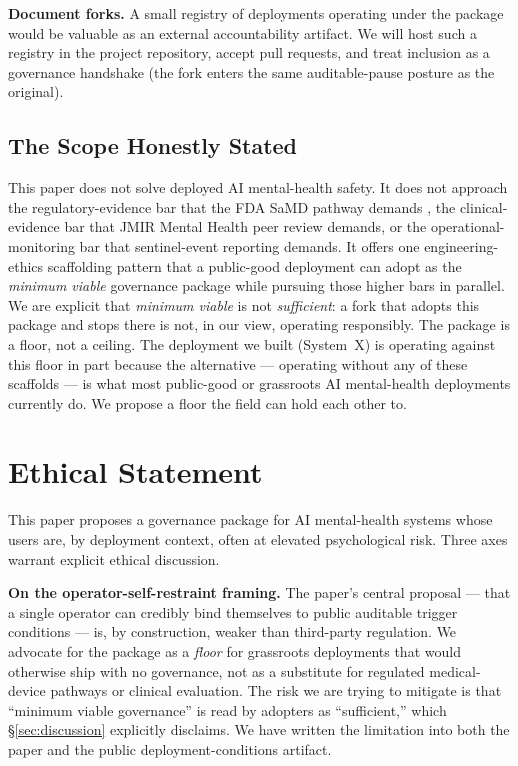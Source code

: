 \documentclass[letterpaper]{article} %
\begin{document}
\noindent\textbf{Document forks.} A small registry of deployments operating under the package would be valuable as an external accountability artifact. We will host such a registry in the project repository, accept pull requests, and treat inclusion as a governance handshake (the fork enters the same auditable-pause posture as the original).

\subsection{The Scope Honestly Stated}

This paper does not solve deployed AI mental-health safety. It does not approach the regulatory-evidence bar that the FDA SaMD pathway demands \citep{fda2017samd}, the clinical-evidence bar that JMIR Mental Health peer review demands, or the operational-monitoring bar that sentinel-event reporting demands. It offers one engineering-ethics scaffolding pattern that a public-good deployment can adopt as the \emph{minimum viable} governance package while pursuing those higher bars in parallel. We are explicit that \emph{minimum viable} is not \emph{sufficient}: a fork that adopts this package and stops there is not, in our view, operating responsibly. The package is a floor, not a ceiling. The deployment we built (System~X) is operating against this floor in part because the alternative --- operating without any of these scaffolds --- is what most public-good or grassroots AI mental-health deployments currently do. We propose a floor the field can hold each other to.

\section*{Ethical Statement}

This paper proposes a governance package for AI mental-health systems whose users are, by deployment context, often at elevated psychological risk. Three axes warrant explicit ethical discussion.

\noindent\textbf{On the operator-self-restraint framing.} The paper's central proposal --- that a single operator can credibly bind themselves to public auditable trigger conditions --- is, by construction, weaker than third-party regulation. We advocate for the package as a \emph{floor} for grassroots deployments that would otherwise ship with no governance, not as a substitute for regulated medical-device pathways or clinical evaluation. The risk we are trying to mitigate is that ``minimum viable governance'' is read by adopters as ``sufficient,'' which \S\ref{sec:discussion} explicitly disclaims. We have written the limitation into both the paper and the public deployment-conditions artifact.
\end{document}

